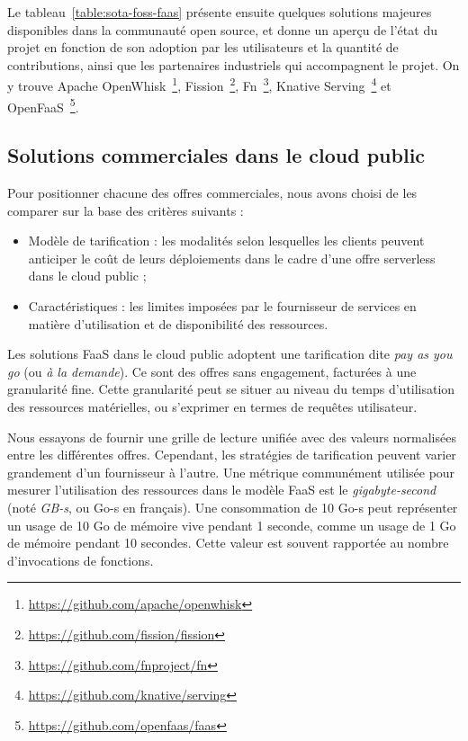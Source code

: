 Le tableau~\ref{table:sota-foss-faas} présente ensuite quelques solutions majeures disponibles dans la communauté open source, et donne un aperçu de l'état du projet en fonction de son adoption par les utilisateurs et la quantité de contributions, ainsi que les partenaires industriels qui accompagnent le projet. On y trouve Apache OpenWhisk~\footnote{\label{footnote:openwhisk}\href{https://github.com/apache/openwhisk}{https://github.com/apache/openwhisk}}, Fission~\footnote{\label{footnote:fission}\href{https://github.com/fission/fission}{https://github.com/fission/fission}}, Fn~\footnote{\label{footnote:fn}\href{https://github.com/fnproject/fn}{https://github.com/fnproject/fn}}, Knative Serving~\footnote{\label{footnote:knative}\href{https://github.com/knative/serving}{https://github.com/knative/serving}} et OpenFaaS~\footnote{\label{footnote:openfaas}\href{https://github.com/openfaas/faas}{https://github.com/openfaas/faas}}.

\subsection{Solutions commerciales dans le cloud public}

Pour positionner chacune des offres commerciales, nous avons choisi de les comparer sur la base des critères suivants :

\begin{itemize}
    \item Modèle de tarification : les modalités selon lesquelles les clients peuvent anticiper le coût de leurs déploiements dans le cadre d'une offre serverless dans le cloud public ;
    \item Caractéristiques : les limites imposées par le fournisseur de services en matière d'utilisation et de disponibilité des ressources.
\end{itemize}

Les solutions \gls{FaaS} dans le cloud public adoptent une tarification dite \textit{pay as you go} (ou \textit{à la demande}). Ce sont des offres sans engagement, facturées à une granularité fine. Cette granularité peut se situer au niveau du temps d'utilisation des ressources matérielles, ou s'exprimer en termes de requêtes utilisateur.

Nous essayons de fournir une grille de lecture unifiée avec des valeurs normalisées entre les différentes offres. Cependant, les stratégies de tarification peuvent varier grandement d'un fournisseur à l'autre. Une métrique communément utilisée pour mesurer l'utilisation des ressources dans le modèle \gls{FaaS} est le \textit{gigabyte-second} (noté \textit{GB-s}, ou Go-s en français). Une consommation de 10 Go-s peut représenter un usage de 10 Go de mémoire vive pendant 1 seconde, comme un usage de 1 Go de mémoire pendant 10 secondes. Cette valeur est souvent rapportée au nombre d'invocations de fonctions.

